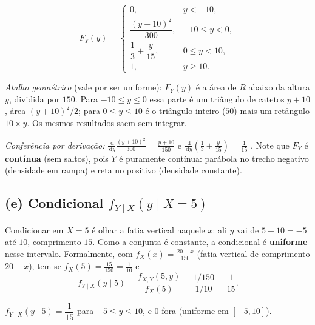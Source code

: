 \documentclass[11pt,a4paper]{article}
\newcommand{\dd}{\,\mathrm{d}}
\begin{document}
\begin{resp}
\[
F_Y(y)=\begin{cases}
0, & y<-10,\\[3pt]
\dfrac{(y+10)^2}{300}, & -10\le y<0,\\[6pt]
\dfrac13+\dfrac{y}{15}, & 0\le y<10,\\[6pt]
1, & y\ge10.
\end{cases}
\]
\end{resp}

\emph{Atalho geométrico} (vale por ser uniforme): $F_Y(y)$ é a área de $R$ abaixo da
altura $y$, dividida por $150$. Para $-10\le y\le0$ essa parte é um triângulo de
catetos $y+10$, área $(y+10)^2/2$; para $0\le y\le10$ é o triângulo inteiro ($50$)
mais um retângulo $10\times y$. Os mesmos resultados saem sem integrar.

\emph{Conferência por derivação:} $\frac{\dd}{\dd y}\frac{(y+10)^2}{300}=\frac{y+10}{150}$
\checkmark \; e $\frac{\dd}{\dd y}\left(\frac13+\frac{y}{15}\right)=\frac1{15}$ \checkmark.
Note que $F_Y$ é \textbf{contínua} (sem saltos), pois $Y$ é puramente contínua:
parábola no trecho negativo (densidade em rampa) e reta no positivo (densidade constante).

\subsection*{(e) Condicional $f_{Y\mid X}(y\mid X=5)$}

Condicionar em $X=5$ é olhar a fatia vertical naquele $x$: ali
$y$ vai de $5-10=-5$ até $10$, comprimento $15$. Como a conjunta é constante, a
condicional é \textbf{uniforme} nesse intervalo. Formalmente, com
$f_X(x)=\frac{20-x}{150}$ (fatia vertical de comprimento $20-x$), tem-se
$f_X(5)=\frac{15}{150}=\frac1{10}$ e
\[
f_{Y\mid X}(y\mid 5)=\frac{f_{X,Y}(5,y)}{f_X(5)}=\frac{1/150}{1/10}=\frac{1}{15}.
\]

\begin{resp}
$f_{Y\mid X}(y\mid 5)=\dfrac{1}{15}$ para $-5\le y\le 10$, e $0$ fora
(uniforme em $[-5,10]$).
\end{resp}

\begin{center}
\end{center}
\end{document}
